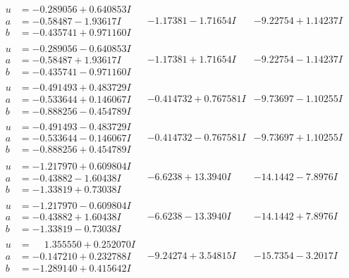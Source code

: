 \documentclass[1p]{elsarticle_modified}
\theoremstyle{definition}
\begin{document}
$$\begin{array}{c|c|c}
\begin{aligned}
u &= -0.289056 + 0.640853 I \\
a &= -0.58487 - 1.93617 I \\
b &= -0.435741 + 0.971160 I\end{aligned}
 & -1.17381 - 1.71654 I & -9.22754 + 1.14237 I \\ \hline\begin{aligned}
u &= -0.289056 - 0.640853 I \\
a &= -0.58487 + 1.93617 I \\
b &= -0.435741 - 0.971160 I\end{aligned}
 & -1.17381 + 1.71654 I & -9.22754 - 1.14237 I \\ \hline\begin{aligned}
u &= -0.491493 + 0.483729 I \\
a &= -0.533644 + 0.146067 I \\
b &= -0.888256 - 0.454789 I\end{aligned}
 & -0.414732 + 0.767581 I & -9.73697 - 1.10255 I \\ \hline\begin{aligned}
u &= -0.491493 - 0.483729 I \\
a &= -0.533644 - 0.146067 I \\
b &= -0.888256 + 0.454789 I\end{aligned}
 & -0.414732 - 0.767581 I & -9.73697 + 1.10255 I \\ \hline\begin{aligned}
u &= -1.217970 + 0.609804 I \\
a &= -0.43882 - 1.60438 I \\
b &= -1.33819 + 0.73038 I\end{aligned}
 & -6.6238 + 13.3940 I & -14.1442 - 7.8976 I \\ \hline\begin{aligned}
u &= -1.217970 - 0.609804 I \\
a &= -0.43882 + 1.60438 I \\
b &= -1.33819 - 0.73038 I\end{aligned}
 & -6.6238 - 13.3940 I & -14.1442 + 7.8976 I \\ \hline\begin{aligned}
u &= \phantom{-}1.355550 + 0.252070 I \\
a &= -0.147210 + 0.232788 I \\
b &= -1.289140 + 0.415642 I\end{aligned}
 & -9.24274 + 3.54815 I & -15.7354 - 3.2017 I \\ \hline\begin{aligned}

\end{aligned}
\end{array}$$
\end{document}
